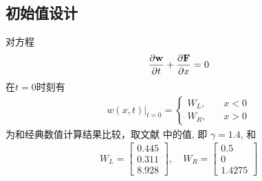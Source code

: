 \documentclass[10.5pt
]{article}
\begin{document}
\subsection{初始值设计}
对方程
\begin{align}
\frac{\partial \vb w}{\partial t} + \frac{\partial \vb F}{\partial x} = 0
\end{align}
在$t = 0$时刻有
\begin{align}
w(x,t)|_{t=0} = \left\{ \begin{array}{ll}
W_L, & \quad x < 0 \\
W_R, & \quad x > 0
\end{array} \right.
\end{align}
为和经典数值计算结果比较，取文献 \citet{Harten1983} 中的值, 即 $\gamma=1.4$, 和
\begin{align}
    W_L = \left[\begin{array}{l}
    0.445\\
    0.311\\
    8.928
    \end{array}\right], \quad W_R = \left[\begin{array}{l}
    0.5\\
    0\\
    1.4275
    \end{array}\right]
\end{align}
\end{document}
